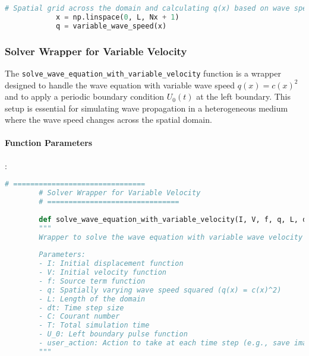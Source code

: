 \documentclass{article}
\begin{document}
		\begin{lstlisting}[language=Python]
			# Spatial grid across the domain and calculating q(x) based on wave speed
			x = np.linspace(0, L, Nx + 1)
			q = variable_wave_speed(x)
		\end{lstlisting}
		
		\subsubsection{Solver Wrapper for Variable Velocity}
		
		The \texttt{solve\_wave\_equation\_with\_variable\_velocity} function is a wrapper designed to handle the wave equation with variable wave speed \( q(x) = c(x)^2 \) and to apply a periodic boundary condition \( U_0(t) \) at the left boundary. This setup is essential for simulating wave propagation in a heterogeneous medium where the wave speed changes across the spatial domain.
		
		\paragraph{Function Parameters}
		:
		
		\begin{lstlisting}[language=Python]
		# ===============================
		# Solver Wrapper for Variable Velocity
		# ===============================
		
		def solve_wave_equation_with_variable_velocity(I, V, f, q, L, dt, C, T, U_0, user_action=None, version='scalar', boundary='Dirichlet'):
		"""
		Wrapper to solve the wave equation with variable wave velocity `q(x)` and a moving boundary condition `U_0`.
		
		Parameters:
		- I: Initial displacement function
		- V: Initial velocity function
		- f: Source term function
		- q: Spatially varying wave speed squared (q(x) = c(x)^2)
		- L: Length of the domain
		- dt: Time step size
		- C: Courant number
		- T: Total simulation time
		- U_0: Left boundary pulse function
		- user_action: Action to take at each time step (e.g., save images)
		"""
		\end{lstlisting}
		
\end{document}
